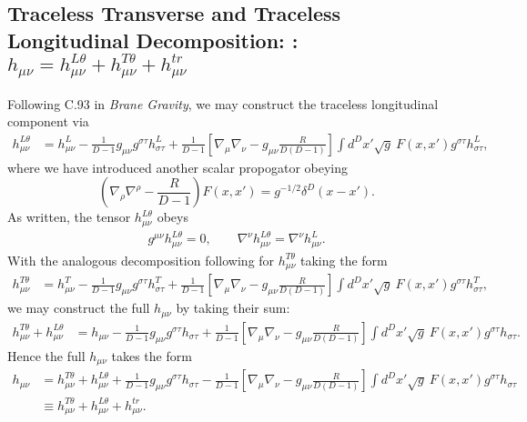 \documentclass[10pt,letterpaper]{article}
\begin{document}
\subsection*{Traceless Transverse and Traceless Longitudinal Decomposition: : $h_{\mu\nu} = h^{L\theta}_{\mu\nu}+h^{T\theta}_{\mu\nu}+h^{tr}_{\mu\nu}$}
Following C.93 in \emph{Brane Gravity}, we may construct the traceless longitudinal component via
\begin{align}
h_{\mu\nu}^{L\theta} &= h_{\mu\nu}^L - \frac{1}{D-1} g_{\mu\nu} g^{\sigma\tau}h^L_{\sigma\tau} +\frac{1}{D-1}
\left[ \nabla_\mu\nabla_\nu- g_{\mu\nu}\frac{R}{D(D-1)}\right] \int d^Dx' \sqrt{g}\ F(x,x')g^{\sigma\tau}h_{\sigma\tau}^L ,
\end{align}
where we have introduced another scalar propogator obeying
\begin{equation}
\left( \nabla_\rho \nabla^\rho - \frac{R}{D-1}\right)F(x,x') = g^{-1/2} \delta^D (x-x').
\end{equation}
As written, the tensor $h_{\mu\nu}^{L\theta}$ obeys
\begin{align}
g^{\mu\nu}h_{\mu\nu}^{L\theta} = 0,\qquad \nabla^\nu h_{\mu\nu}^{L\theta} = \nabla^\nu h_{\mu\nu}^{L}.
\end{align}
With the analogous decomposition following for $h_{\mu\nu}^{T\theta}$ taking the form
\begin{align}
h_{\mu\nu}^{T\theta} &= h_{\mu\nu}^T - \frac{1}{D-1} g_{\mu\nu} g^{\sigma\tau}h^T_{\sigma\tau} +\frac{1}{D-1}
\left[ \nabla_\mu\nabla_\nu- g_{\mu\nu}\frac{R}{D(D-1)}\right] \int d^Dx' \sqrt{g}\ F(x,x')g^{\sigma\tau}h_{\sigma\tau}^T ,
\end{align}
we may construct the full $h_{\mu\nu}$ by taking their sum:
\begin{align}
h_{\mu\nu}^{T\theta}+h_{\mu\nu}^{L\theta}&= h_{\mu\nu} - \frac{1}{D-1} g_{\mu\nu} g^{\sigma\tau}h_{\sigma\tau} +\frac{1}{D-1}
\left[ \nabla_\mu\nabla_\nu- g_{\mu\nu}\frac{R}{D(D-1)}\right] \int d^Dx' \sqrt{g}\ F(x,x')g^{\sigma\tau}h_{\sigma\tau}.
\end{align}
Hence the full $h_{\mu\nu}$ takes the form
\begin{align}
h_{\mu\nu}&= h_{\mu\nu}^{T\theta}+h_{\mu\nu}^{L\theta} + \frac{1}{D-1} g_{\mu\nu} g^{\sigma\tau}h_{\sigma\tau} -\frac{1}{D-1}
\left[ \nabla_\mu\nabla_\nu- g_{\mu\nu}\frac{R}{D(D-1)}\right] \int d^Dx' \sqrt{g}\ F(x,x')g^{\sigma\tau}h_{\sigma\tau}
\nonumber\\
&\equiv h_{\mu\nu}^{T\theta}+h_{\mu\nu}^{L\theta}+h^{tr}_{\mu\nu}.
\end{align}
\end{document}
